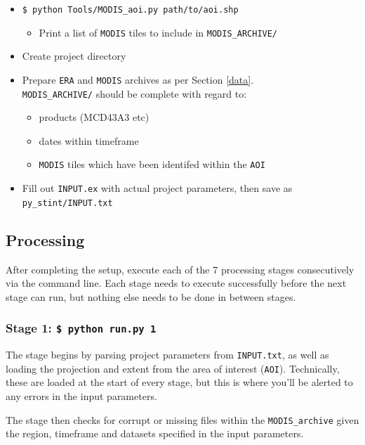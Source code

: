 \documentclass[twoside,a4paper]{refart}
\begin{document}
\begin{itemize}
    \item
        \texttt{\$ python Tools/MODIS\_aoi.py path/to/aoi.shp}
        \begin{itemize}
            \item
                Print a list of \texttt{MODIS} tiles to include in 
                \texttt{MODIS\_ARCHIVE/}
        \end{itemize}
    
    \item
        Create project directory
    \item
        Prepare \texttt{ERA} and \texttt{MODIS} archives 
        as per Section \ref{data}.  \\
        \texttt{MODIS\_ARCHIVE/} should be complete
        with regard to:
        \begin{itemize}
        \item
            products (MCD43A3 etc)
        \item
            dates within timeframe
        \item
            \texttt{MODIS} tiles which have been identifed within the \texttt{AOI}
        \end{itemize}
    \item
        Fill out \texttt{INPUT.ex} with actual project parameters, 
        then save as \texttt{py\_stint/INPUT.txt}
\end{itemize}


\subsection{Processing}
\label{stages}
After completing the setup, execute each of the 7 processing stages 
consecutively via the command line.  Each stage needs to execute successfully
before the next stage can run, but nothing else needs to be done in between stages.

\subsubsection{\textbf{Stage 1:} \texttt{\$ python run.py 1}}
The stage begins by parsing project parameters from \texttt{INPUT.txt}, 
as well as loading the projection and extent from the area of interest 
(\texttt{AOI}). Technically, these are loaded at the start of every stage, 
but this is where you'll be alerted to any errors in the input parameters.

The stage then checks for corrupt or missing files within the 
\texttt{MODIS\_archive} given the region, timeframe and datasets 
specified in the input parameters.
\end{document}
